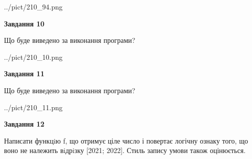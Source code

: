\documentclass[12pt, ukrainian]{article}
\begin{document}
{\begin {large}
\begin{center}
	{../pict/210_94.png}
\end{center}
\newpage

{\begin {center}\textbf{Завдання 10}\end {center}}

Що буде виведено за виконання програми?\par
\begin{center}
	{../pict/210_10.png}
\end{center}
\newpage

{\begin {center}\textbf{Завдання 11}\end {center}}

Що буде виведено за виконання програми?\par
\begin{center}
	{../pict/210_11.png}
\end{center}
\newpage

{\begin {center}\textbf{Завдання 12}\end {center}}


Написати функцiю f, що отримує ціле число і повертає логічну ознаку того, що воно не належить вiдрiзку [2021; 2022]. Стиль запису умови також оцінюється.\par
\newpage

\end {large}}
\end{document}
